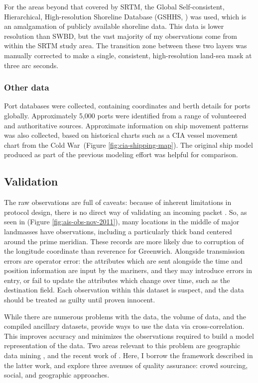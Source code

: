 For the areas beyond that covered by SRTM, the Global Self-consistent, Hierarchical, High-resolution Shoreline Database (GSHHS, \citealp{wessel1996global}) was used, which is an amalgamation of publicly available shoreline data. This data is lower resolution than SWBD, but the vast majority of my observations come from within the SRTM study area. The transition zone between these two layers was manually corrected to make a single, consistent, high-resolution land-sea mask at three arc seconds.

\subsubsection{Other data}
Port databases were collected, containing coordinates and berth details for ports globally. Approximately 5,000 ports were identified from a range of volunteered and authoritative sources.  Approximate information on ship movement patterns was also collected, based on historical charts such as a CIA vessel movement chart from the Cold War~(Figure \ref{fig:cia-shipping-map}). The original ship model produced as part of the previous modeling effort \citep{Halpern2008} was helpful for comparison.

\subsection{Validation}

The raw observations are full of caveats: because of inherent limitations in protocol design, there is no direct way of validating an incoming packet \citep{RaymondInPress}. So, as seen in (Figure \ref{fig:ais-obs-nov-2011}), many locations in the middle of major landmasses have observations, including a particularly thick band centered around the prime meridian. These records are more likely due to corruption of the longitude coordinate than reverence for Greenwich. Alongside transmission errors are operator error: the attributes which are sent alongside the time and position information are input by the mariners, and they may introduce errors in entry, or fail to update the attributes which change over time, such as the destination field. Each observation within this dataset is suspect, and the data should be treated as guilty until proven innocent.

While there are numerous problems with the data, the volume of data, and the compiled ancillary datasets, provide ways to use the data via cross-correlation. This improves accuracy and minimizes the observations required to build a model representation of the data. Two areas relevant to this problem are geographic data mining \citep{miller2009geographic}, and the recent work of \cite{goodchildli2012}. Here, I borrow the framework described in the latter work, and explore three avenues of quality assurance: crowd sourcing, social, and geographic approaches.

